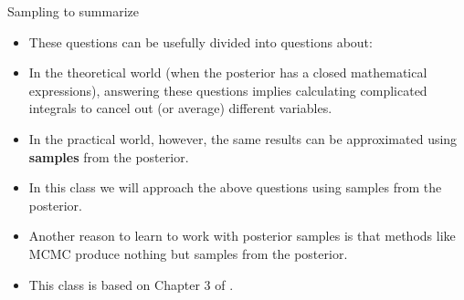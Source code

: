 \documentclass[handout]{beamer}
\begin{document}
\begin{frame}{Sampling to summarize}
\scriptsize{
\begin{itemize}

\item These questions can be usefully divided into questions about: 
 
\item In the theoretical world (when the posterior has a closed mathematical expressions), answering these questions implies calculating complicated integrals to cancel out (or average) different variables.

\item In the practical world, however, the same results can be approximated  using \textbf{samples} from the posterior. 
 
\item In this class we will approach the above questions using samples from the posterior. 

\item Another reason to learn to work with posterior samples is that methods like MCMC produce nothing but samples from the posterior.


\item This class is based on Chapter 3 of \cite{mcelreath2020statistical}.

\end{itemize}
}

\end{frame}
\end{document}
